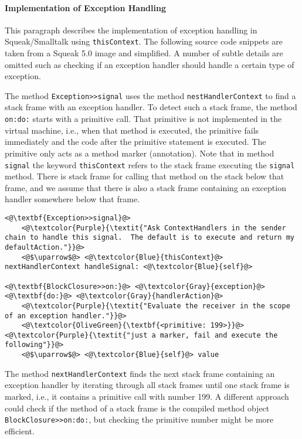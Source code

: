 \documentclass[12pt]{article}
\begin{document}
\paragraph{Implementation of Exception Handling}
This paragraph describes the implementation of exception handling in Squeak/Smalltalk using \texttt{thisContext}. The following source code snippets are taken from a Squeak 5.0 image and simplified. A number of subtle details are omitted such as checking if an exception handler should handle a certain type of exception.

The method \texttt{Exception>>signal} uses the method \texttt{nestHandlerContext} to find a stack frame with an exception handler. To detect such a stack frame, the method \texttt{on:do:} starts with a primitive call. That primitive is not implemented in the virtual machine, i.e., when that method is executed, the primitive fails immediately and the code after the primitive statement is executed. The primitive only acts as a method marker (annotation). Note that in method \texttt{signal} the keyword \texttt{thisContext} refers to the stack frame executing the \texttt{signal} method. There is stack frame for calling that method on the stack below that frame, and we assume that there is also a stack frame containing an exception handler somewhere below that frame.

\begin{lstlisting}
<@\textbf{Exception>>signal}@>
    <@\textcolor{Purple}{\textit{"Ask ContextHandlers in the sender chain to handle this signal.  The default is to execute and return my defaultAction."}}@>
    <@$\uparrow$@> <@\textcolor{Blue}{thisContext}@> nextHandlerContext handleSignal: <@\textcolor{Blue}{self}@>
    
<@\textbf{BlockClosure>>on:}@> <@\textcolor{Gray}{exception}@> <@\textbf{do:}@> <@\textcolor{Gray}{handlerAction}@>
    <@\textcolor{Purple}{\textit{"Evaluate the receiver in the scope of an exception handler."}}@>
    <@\textcolor{OliveGreen}{\textbf{<primitive: 199>}}@>  <@\textcolor{Purple}{\textit{"just a marker, fail and execute the following"}}@>
    <@$\uparrow$@> <@\textcolor{Blue}{self}@> value
\end{lstlisting}

The method \texttt{nextHandlerContext} finds the next stack frame containing an exception handler by iterating through all stack frames until one stack frame is marked, i.e., it contains a primitive call with number 199. A different approach could check if the method of a stack frame is the compiled method object \texttt{BlockClosure>>on:do:}, but checking the primitive number might be more efficient.
\end{document}
